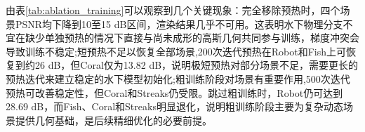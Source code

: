由表\ref{tab:ablation_training}可以观察到几个关键现象：完全移除预热时，四个场景PSNR均下降到10至15 dB区间，渲染结果几乎不可用。这表明水下物理分支不宜在缺少单独预热的情况下直接与尚未成形的高斯几何共同参与训练，梯度冲突会导致训练不稳定;短预热不足以恢复全部场景,200次迭代预热在Robot和Fish上可恢复到约26 dB，但Coral仅为13.82 dB，说明极短预热对部分场景不足，需要更长的预热迭代来建立稳定的水下模型初始化;粗训练阶段对场景有重要作用,500次迭代预热可改善稳定性，但Coral和Streaks仍受限。跳过粗训练时，Robot仍可达到28.69 dB，而Fish、Coral和Streaks明显退化，说明粗训练阶段主要为复杂动态场景提供几何基础，是后续精细优化的必要前提。

